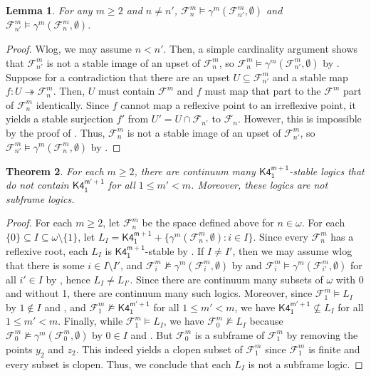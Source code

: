 \documentclass[a4paper,11pt]{article}
\newtheorem{theorem}{Theorem}
\newtheorem{lemma}[theorem]{Lemma}
\theoremstyle{definition}
\theoremstyle{remark}
\numberwithin{theorem}{section}
\newcommand{\fr}[1]{\mathcal{#1}}
\newcommand{\F}{\fr{F}}
\newcommand{\logic}[1]{\mathsf{#1}}
\newcommand{\Kff}[2]{\logic{K4^{#1}_{#2}}}
\newcommand{\emp}{\emptyset}
\newcommand{\surj}{\twoheadrightarrow}
\begin{document}
\begin{lemma} \label{Lem K4m1 stable fml ex}
    For any $m \geq 2$ and $n \neq n'$, $\F^m_n \models \gamma^m(\F^m_{n'}, \emp)$ and $\F^m_{n'} \models \gamma^m(\F^m_n, \emp)$.
\end{lemma}

\begin{proof}
    Wlog, we may assume $n < n'$. Then, a simple cardinality argument shows that $\F^m_{n'}$ is not a stable image of an upset of $\F^m_n$, so $\F^m_n \models \gamma^m(\F^m_{n'}, \emp)$ by . Suppose for a contradiction that there are an upset $U \subseteq \F^m_{n'}$ and a stable map $f: U \surj \F^m_n$. Then, $U$ must contain $\F^m$ and $f$ must map that part to the $\F^m$ part of $\F^m_n$ identically. Since $f$ cannot map a reflexive point to an irreflexive point, it yields a stable surjection $f'$ from $U' = U \cap \F_{n'}$ to $\F_n$. However, this is impossible by the proof of \cite[Lemma 6.12]{LocallyFiniteReducts2017}. Thus, $\F^m_n$ is not a stable image of an upset of $\F^m_{n'}$, so $\F^m_{n'} \models \gamma^m(\F^m_n, \emp)$ by .
\end{proof}

\begin{theorem} \label{Thm conti many K4m1 stable}
    For each $m \geq 2$, there are continuum many $\Kff{m+1}{1}$-stable logics that do not contain $\Kff{m'+1}{1}$ for all $1 \leq m' < m$. Moreover, these logics are not subframe logics.
\end{theorem}

\begin{proof}
    For each $m \geq 2$, let $\F^m_n$ be the space defined above for $n \in \omega$. For each $\{0\} \subseteq I \subseteq \omega \setminus\{1\}$, let $L_I = \Kff{m+1}{1} + \{\gamma^m(\F^m_n, \emp): i \in I\}$. Since every $\F^m_n$ has a reflexive root, each $L_I$ is $\Kff{m+1}{1}$-stable by . If $I \neq I'$, then we may assume wlog that there is some $i \in I \setminus I'$, and $\F^m_i \not\models \gamma^m(\F^m_i, \emp)$ by  and $\F^m_i \models \gamma^m(\F^m_{i'}, \emp)$ for all $i' \in I$ by , hence $L_I \neq L_{I'}$. Since there are continuum many subsets of $\omega$ with 0 and without 1, there are continuum many such logics. Moreover, since $\F^m_1 \models L_I$ by $1 \notin I$ and , and $\F^m_1 \not\models \Kff{m'+1}{1}$ for all $1 \leq m' < m$, we have $\Kff{m'+1}{1} \not\subseteq L_I$ for all $1 \leq m' < m$. Finally, while $\F^m_1 \models L_I$, we have $\F^m_0 \not\models L_I$ because $\F^m_0 \not\models \gamma^m(\F^m_0, \emp)$ by $0 \in I$ and . But $\F^m_0$ is a subframe of $\F^m_1$ by removing the points $y_2$ and $z_2$. This indeed yields a clopen subset of $\F^m_1$ since $\F^m_1$ is finite and every subset is clopen. Thus, we conclude that each $L_I$ is not a subframe logic.
\end{proof}
\end{document}

